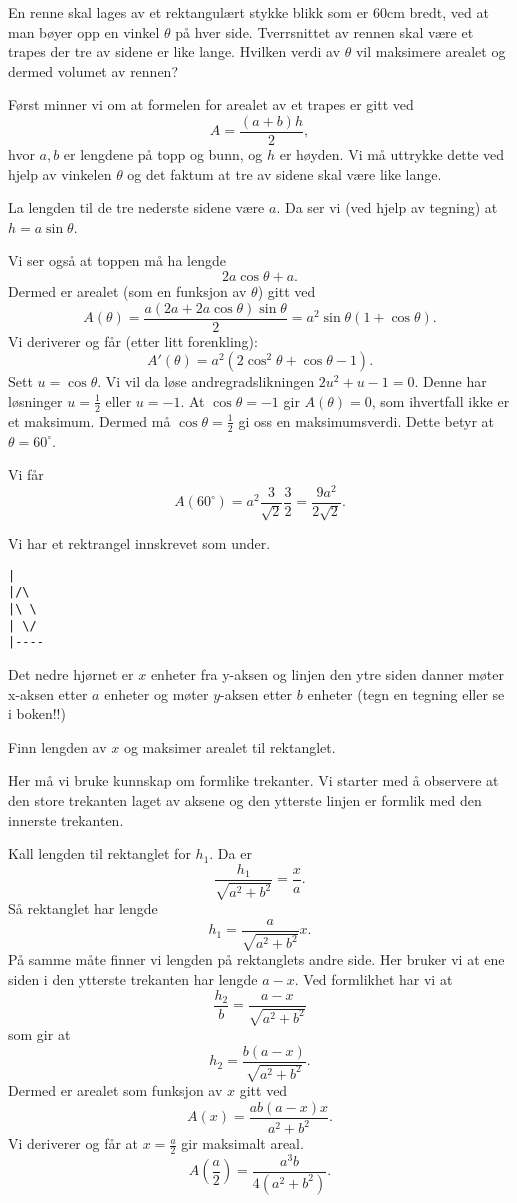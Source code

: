 \documentclass[11pt, norsk]{article}
\begin{document}
\begin{oppg}[7.7]
En renne skal lages av et rektangulært stykke blikk som er 60cm bredt, ved at man bøyer opp en vinkel $\theta$ på hver side. Tverrsnittet av rennen skal være et trapes der tre av sidene er like lange. Hvilken verdi av $\theta$ vil maksimere arealet og dermed volumet av rennen?
\end{oppg}

\begin{losn}
Først minner vi om at formelen for arealet av et trapes er gitt ved
$$
A = \frac{(a+b)h}{2},
$$
hvor $a,b$ er lengdene på topp og bunn, og $h$ er høyden. Vi må uttrykke dette ved hjelp av vinkelen $\theta$ og det faktum at tre av sidene skal være like lange.

La lengden til de tre nederste sidene være $a$. Da ser vi (ved hjelp av tegning) at $h=a \sin \theta$. 

Vi ser også at toppen må ha lengde
$$
2a\cos \theta + a.
$$
Dermed er arealet (som en funksjon av $\theta$) gitt ved
$$
A(\theta) = \frac{a(2a+2 a\cos \theta)\sin \theta}{2}=a^2 \sin \theta(1+\cos \theta).
$$
Vi deriverer og får (etter litt forenkling):
$$
A'(\theta) = a^2(2 \cos^2 \theta + \cos \theta -1).
$$
Sett $u=\cos \theta$. Vi vil da løse andregradslikningen $2u^2+u-1=0$. Denne har løsninger $u=\frac 12$ eller $u=-1$. At $\cos \theta = -1$ gir $A(\theta)=0$, som ihvertfall ikke er et maksimum. Dermed må $\cos \theta= \frac 12$ gi oss en maksimumsverdi. Dette betyr at $\theta= 60^\circ$.

Vi får
$$
A(60 ^\circ) = a^2 \frac{3}{\sqrt{2}}\frac{3}{2} = \frac{9a^2}{2\sqrt{2}}.
$$
\end{losn}

\begin{oppg}
Vi har et rektrangel innskrevet som under.
\begin{verbatim}
|
|/\
|\ \
| \/
|----
\end{verbatim}
Det nedre hjørnet er $x$ enheter fra y-aksen og linjen den ytre siden danner møter x-aksen etter $a$ enheter og møter $y$-aksen etter $b$ enheter (tegn en tegning eller se i boken!!)

Finn lengden av $x$ og maksimer arealet til rektanglet.
\end{oppg}
\begin{losn}
Her må vi bruke kunnskap om formlike trekanter. Vi starter med å observere at den store trekanten laget av aksene og den ytterste linjen er formlik med den innerste trekanten.

Kall lengden til rektanglet for $h_1$. Da er
$$
\frac{h_1}{\sqrt{a^2+b^2}} = \frac{x}{a}.
$$
Så rektanglet har lengde
$$
h_1 = \frac{a}{\sqrt{a^2+b^2}}x.
$$
På samme måte finner vi lengden på rektanglets andre side. Her bruker vi at ene siden i den ytterste trekanten har lengde $a-x$. Ved formlikhet har vi at 
$$
\frac{h_2}{b} = \frac{a-x}{\sqrt{a^2+b^2}}
$$
som gir at
$$
h_2 = \frac{b(a-x)}{\sqrt{a^2+b^2}}.
$$
Dermed er arealet som funksjon av $x$ gitt ved
$$
A(x) = \frac{ab(a-x)x}{a^2+b^2}.
$$
Vi deriverer og får at $x=\frac a2$ gir maksimalt areal.
$$
A\left(\frac a2 \right) = \frac{a^3b}{4(a^2+b^2)}.
$$
\end{losn}
\end{document}
